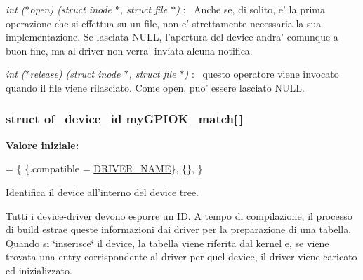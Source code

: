\begin{DoxyItemize}
\item {\itshape int ($\ast$open) (struct inode $\ast$, struct file $\ast$)} \+:~\newline
 Anche se, di solito, e' la prima operazione che si effettua su un file, non e' strettamente necessaria la sua implementazione. Se lasciata N\+U\+L\+L, l'apertura del device andra' comunque a buon fine, ma al driver non verra' inviata alcuna notifica.
\item {\itshape int ($\ast$release) (struct inode $\ast$, struct file $\ast$)} \+:~\newline
 questo operatore viene invocato quando il file viene rilasciato. Come open, puo' essere lasciato N\+U\+L\+L. 
\end{DoxyItemize}\hypertarget{group___linux-_driver_gab59f49dc0fe8d885c73752b8a8163d0e}{
\subsubsection[{my\+G\+P\+I\+O\+K\+\_\+match}]{\setlength{\rightskip}{0pt plus 5cm}struct of\+\_\+device\+\_\+id my\+G\+P\+I\+O\+K\+\_\+match\mbox{[}$\,$\mbox{]}\hspace{0.3cm}{\ttfamily [static]}}}\label{group___linux-_driver_gab59f49dc0fe8d885c73752b8a8163d0e}
{\bfseries Valore iniziale\+:}
\begin{DoxyCode}
= \{
        \{.compatible = \hyperlink{group___linux-_driver_ga25634d21648ca7fb7a2aca614bafaaeb}{DRIVER\_NAME}\},
        \{\},
\}
\end{DoxyCode}


Identifica il device all'interno del device tree. 

Tutti i device-\/driver devono esporre un I\+D. A tempo di compilazione, il processo di build estrae queste informazioni dai driver per la preparazione di una tabella. Quando si \char`\"{}inserisce\char`\"{} il device, la tabella viene riferita dal kernel e, se viene trovata una entry corrispondente al driver per quel device, il driver viene caricato ed inizializzato. 